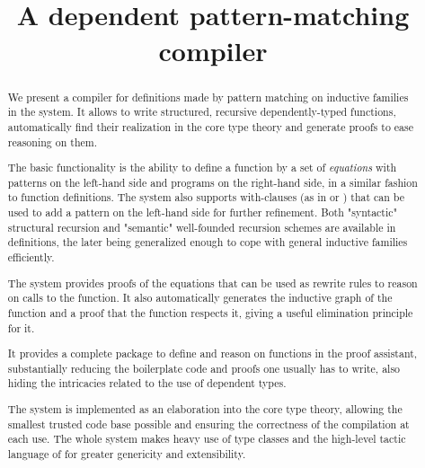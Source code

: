 \documentclass[9pt]{sigplanconf}
\title{\Equations\\
  A dependent pattern-matching compiler}
\begin{document}
\maketitle

\begin{abstract}
  We present a compiler for definitions made by pattern matching on
  inductive families in the \Coq system. It allows to write structured,
  recursive dependently-typed functions, automatically find their
  realization in the core type theory and generate proofs to ease
  reasoning on them.
  
  The basic functionality is the ability to define a function by a set
  of \textit{equations} with patterns on the left-hand side and programs
  on the right-hand side, in a similar fashion to \Haskell
  function definitions. The system also supports with-clauses (as in
  \Epigram or \Agda) that can be used to add a pattern on the left-hand
  side for further refinement. Both "syntactic" structural recursion and
  "semantic" well-founded recursion schemes are available in definitions,
  the later being generalized enough to cope with general inductive
  families efficiently.
  
  The system provides proofs of the equations that can be used as
  rewrite rules to reason on calls to the function. It also
  automatically generates the inductive graph of the function and a
  proof that the function respects it, giving a useful elimination
  principle for it.

  It provides a complete package to define 
  and reason on functions in the proof assistant, substantially
  reducing the boilerplate code and proofs one usually has to write, 
  also hiding the intricacies related to the use of dependent types.
  
  The system is implemented as an elaboration into the core \Coq type
  theory, allowing the smallest trusted code base possible and ensuring 
  the correctness of the compilation at each use.
  The whole system makes heavy use of type classes and the high-level
  tactic language of \Coq for greater genericity and extensibility.
\end{abstract}







  


\end{document}
